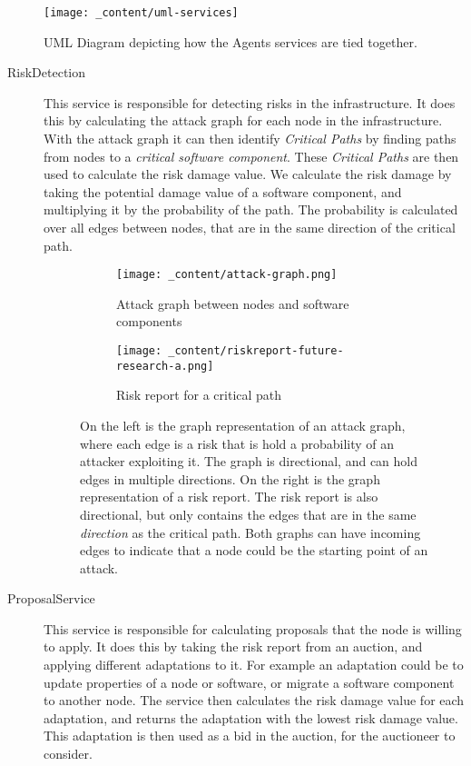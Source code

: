 \begin{figure}[H]
    \centering
    \texttt{[image: \_content/uml-services]}
    \caption{UML Diagram depicting how the Agents services are tied together.}
    \label{fig:uml-services}
\end{figure}

\begin{description}
    \item[RiskDetection] This service is responsible for detecting risks in the infrastructure. It does this by calculating the attack graph for each node in the infrastructure. With the attack graph it can then identify \textit{Critical Paths} by finding paths from nodes to a \textit{critical software component}. These \textit{Critical Paths} are then used to calculate the risk damage value. We calculate the risk damage by taking the potential damage value of a software component, and multiplying it by the probability of the path. The probability is calculated over all edges between nodes, that are in the same direction of the critical path. 
    \begin{figure}[H]
        \centering
        \begin{subfigure}[b]{0.4\textwidth}
            \centering
            \texttt{[image: \_content/attack-graph.png]}
            \caption{Attack graph between nodes and software components}
            \label{fig:attack-graph}
        \end{subfigure}
        \hspace{0.5cm}
        \centering
        \begin{subfigure}[b]{0.4\textwidth}
            \centering
            \texttt{[image: \_content/riskreport-future-research-a.png]}
            \caption{Risk report for a critical path}
            \label{fig:risk-report}
        \end{subfigure}
        \caption{On the left is the graph representation of an attack graph, where each edge is a risk that is hold a probability of an attacker exploiting it. The graph is directional, and can hold edges in multiple directions. On the right is the graph representation of a risk report. The risk report is also directional, but only contains the edges that are in the same \textit{direction} as the critical path. Both graphs can have incoming edges to indicate that a node could be the starting point of an attack.}
    \end{figure}

    \item[ProposalService] This service is responsible for calculating proposals that the node is willing to apply. It does this by taking the risk report from an auction, and applying different adaptations to it. For example an adaptation could be to update properties of a node or software, or migrate a software component to another node. The service then calculates the risk damage value for each adaptation, and returns the adaptation with the lowest risk damage value. This adaptation is then used as a bid in the auction, for the auctioneer to consider. 
    

\end{description}
